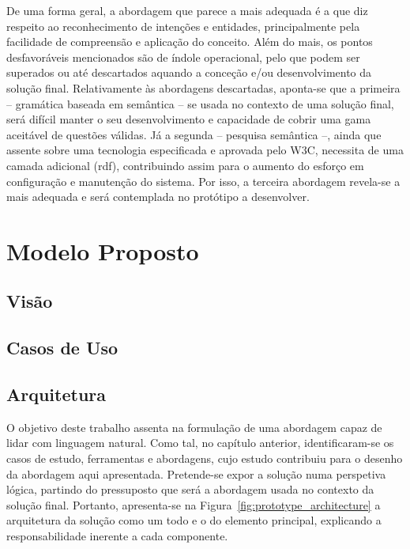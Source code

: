 De uma forma geral, a abordagem que parece a mais adequada é a que diz respeito ao reconhecimento de intenções e entidades, principalmente pela facilidade de compreensão e aplicação do conceito. Além do mais, os pontos desfavoráveis mencionados são de índole operacional, pelo que podem ser superados ou até descartados aquando a conceção e/ou desenvolvimento da solução final. Relativamente às abordagens descartadas, aponta-se que a primeira -- gramática baseada em semântica -- se usada no contexto de uma solução final, será difícil manter o seu desenvolvimento e capacidade de cobrir uma gama aceitável de questões válidas. Já a segunda -- pesquisa semântica --, ainda que assente sobre uma tecnologia especificada e aprovada pelo W3C, necessita de uma camada adicional (\gls{rdf}), contribuindo assim para o aumento do esforço em configuração e manutenção do sistema. Por isso, a terceira abordagem revela-se a mais adequada e será contemplada no protótipo a desenvolver.

\section{Modelo Proposto}
\label{sec:chap04_proposal}
\tbd

\subsection{Visão}
\tbd

\subsection{Casos de Uso}
\tbd

\subsection{Arquitetura}
\tbd

\label{sec:chap04_general_vision}
O objetivo deste trabalho assenta na formulação de uma abordagem capaz de lidar com linguagem natural. Como tal, no capítulo anterior, identificaram-se os casos de estudo, ferramentas e abordagens, cujo estudo contribuiu para o desenho da abordagem aqui apresentada. Pretende-se expor a solução numa perspetiva lógica, partindo do pressuposto que será a abordagem usada no contexto da solução final. Portanto, apresenta-se na Figura~\ref{fig:prototype_architecture} a arquitetura da solução como um todo e o do elemento principal, explicando a responsabilidade inerente a cada componente.

